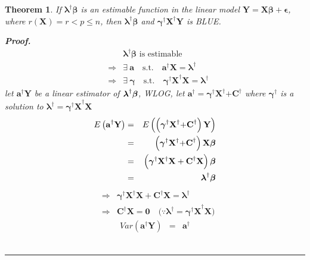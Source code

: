 \documentclass{article}
\newtheorem{theorem}{Theorem}
\newenvironment{proof}[1][Proof]{\noindent\textbf{#1.} }{\ \rule{0.5em}{0.5em}}
\begin{document}
\begin{theorem}
If $\mathbf{\lambda }^{\dagger }\mathbf{\beta }$ is an estimable function in
the linear model $\mathbf{Y=X\beta +\epsilon }$, where $r\left( \mathbf{X}%
\right) =r<p\leq n$, then $\mathbf{\lambda }^{\dagger }\mathbf{\beta }$ and $%
\mathbf{\gamma }^{\dagger }\mathbf{X}^{\dagger }\mathbf{Y}$ is BLUE.

\begin{proof}
\begin{eqnarray*}
&&\mathbf{\lambda }^{\dagger }\mathbf{\beta }\text{ is estimable} \\
&\Rightarrow &\exists \ \mathbf{a\quad }\text{s.t.}\mathbf{\quad a}^{\dagger
}\mathbf{X=\lambda }^{\dagger } \\
&\Rightarrow &\exists \ \mathbf{\gamma \quad }\text{s.t.}\mathbf{\quad
\gamma ^{\dagger }X}^{\dagger }\mathbf{X=\lambda }^{\dagger }
\end{eqnarray*}%
\newline
\newline
let $\mathbf{a}^{\dagger }\mathbf{Y}$ be a linear estimator of $\mathbf{%
\lambda }^{\dagger }\mathbf{\beta }$, WLOG, let $\mathbf{a}^{\dagger }=%
\mathbf{\gamma }^{\dagger }\mathbf{X}^{\dagger }\mathbf{+C}^{\dagger }$
where $\mathbf{\gamma }^{\dagger }$ is a solution to $\mathbf{\lambda
^{\dagger }=\gamma ^{\dagger }X}^{\dagger }\mathbf{X}$%
\begin{eqnarray*}
E\left( \mathbf{a}^{\dagger }\mathbf{Y}\right) &=&E\left( \left( \mathbf{%
\gamma }^{\dagger }\mathbf{X}^{\dagger }\mathbf{+C}^{\dagger }\right) 
\mathbf{Y}\right) \\
&=&\left( \mathbf{\gamma }^{\dagger }\mathbf{X}^{\dagger }\mathbf{+C}%
^{\dagger }\right) \mathbf{X\beta } \\
&=&\left( \mathbf{\gamma }^{\dagger }\mathbf{X}^{\dagger }\mathbf{X+C}%
^{\dagger }\mathbf{X}\right) \mathbf{\beta } \\
&=&\mathbf{\lambda }^{\dagger }\mathbf{\beta }
\end{eqnarray*}%
\begin{eqnarray*}
&\Rightarrow &\mathbf{\gamma }^{\dagger }\mathbf{X}^{\dagger }\mathbf{X+C}%
^{\dagger }\mathbf{X=\lambda }^{\dagger } \\
&\Rightarrow &\mathbf{C}^{\dagger }\mathbf{X=0\quad }\text{(}\because 
\mathbf{\lambda ^{\dagger }=\gamma ^{\dagger }X}^{\dagger }\mathbf{X}\text{)}
\end{eqnarray*}%
\begin{eqnarray*}
Var\left( \mathbf{a}^{\dagger }\mathbf{Y}\right) &=&\mathbf{a}^{\dagger
}
\end{eqnarray*}
\end{proof}
\end{theorem}
\end{document}
